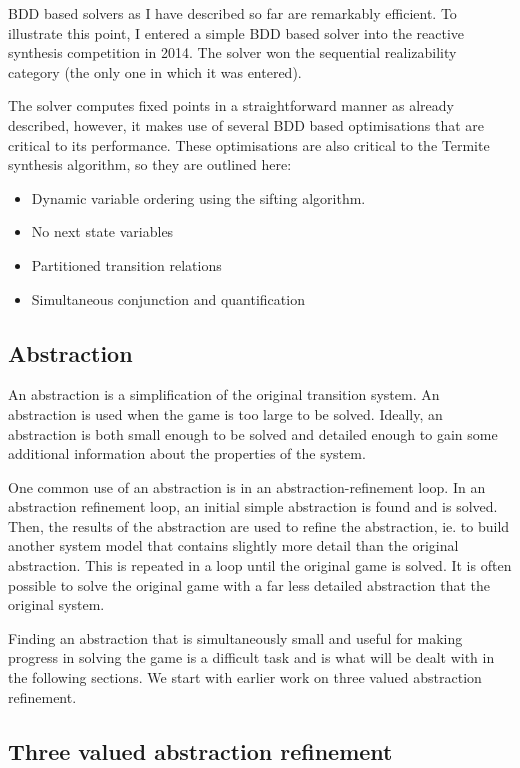 \documentclass{article}
\begin{document}
BDD based solvers as I have described so far are remarkably efficient. To illustrate this point, I entered a simple BDD based solver into the reactive synthesis competition in 2014. The solver won the sequential realizability category (the only one in which it was entered). 

The solver computes fixed points in a straightforward manner as already described, however, it makes use of several BDD based optimisations that are critical to its performance. These optimisations are also critical to the Termite synthesis algorithm, so they are outlined here:

\begin{itemize}
    \item Dynamic variable ordering using the sifting algorithm.
    \item No next state variables
    \item Partitioned transition relations
    \item Simultaneous conjunction and quantification
\end{itemize}

\subsection{Abstraction}
An abstraction is a simplification of the original transition system. An abstraction is used when the game is too large to be solved. Ideally, an abstraction is both small enough to be solved and detailed enough to gain some additional information about the properties of the system. 

One common use of an abstraction is in an abstraction-refinement loop. In an abstraction refinement loop, an initial simple abstraction is found and is solved. Then, the results of the abstraction are used to refine the abstraction, ie. to build another system model that contains slightly more detail than the original abstraction. This is repeated in a loop until the original game is solved. It is often possible to solve the original game with a far less detailed abstraction that the original system. 

Finding an abstraction that is simultaneously small and useful for making progress in solving the game is a difficult task and is what will be dealt with in the following sections. We start with earlier work on three valued abstraction refinement. 

\subsection{Three valued abstraction refinement}
\end{document}
